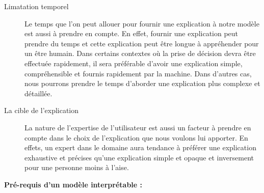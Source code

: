 \begin{description}
\item[Limatation temporel] Le temps que l'on peut allouer pour fournir une explication à notre modèle est aussi à prendre en compte. En effet, fournir une explication peut prendre du temps et cette explication peut être longue à appréhender pour un être humain. Dans certains contextes où la prise de décision devra être effectuée rapidement, il sera préférable d'avoir une explication simple, compréhensible et fournis rapidement par la machine. Dans d'autres cas, nous pourrons prendre le temps d'aborder une explication plus complexe et détaillée.

\item[La cible de l'explication] La nature de l'expertise de l'utilisateur est aussi un facteur à prendre en compte dans le choix de l'explication que nous voulons lui apporter. En effets, un expert dans le domaine aura tendance à préférer une explication exhaustive et précises qu'une explication simple et opaque et inversement pour une personne moins à l'aise.
\end{description}

\textbf{Pré-requis d'un modèle interprétable :}\\

